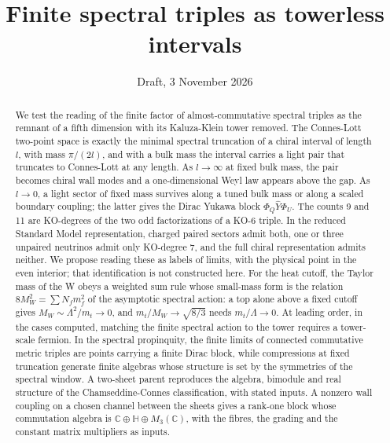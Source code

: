 \documentclass[aps,prd,reprint,onecolumn,nofootinbib,amsmath,amssymb,floatfix]{revtex4-2}
\theoremstyle{plain}
\newcommand{\C}{\mathbb C}
\renewcommand{\H}{\mathbb H}
\begin{document}
\title{Finite spectral triples as towerless intervals}
\date{Draft, 3 November 2026}

\begin{abstract}
We test the reading of the finite factor of almost-commutative spectral triples as the remnant of a fifth dimension with its Kaluza-Klein tower removed. The Connes-Lott two-point space is exactly the minimal spectral truncation of a chiral interval of length $l$, with mass $\pi/(2l)$, and with a bulk mass the interval carries a light pair that truncates to Connes-Lott at any length. As $l\to\infty$ at fixed bulk mass, the pair becomes chiral wall modes and a one-dimensional Weyl law appears above the gap. As $l\to0$, a light sector of fixed mass survives along a tuned bulk mass or along a scaled boundary coupling; the latter gives the Dirac Yukawa block $\Phi_Q\hat Y\Phi_U$. The counts 9 and 11 are KO-degrees of the two odd factorizations of a KO-6 triple. In the reduced Standard Model representation, charged paired sectors admit both, one or three unpaired neutrinos admit only KO-degree 7, and the full chiral representation admits neither. We propose reading these as labels of limits, with the physical point in the even interior; that identification is not constructed here. For the heat cutoff, the Taylor mass of the W obeys a weighted sum rule whose small-mass form is the relation $8M_W^2=\sum N_fm_f^2$ of the asymptotic spectral action: a top alone above a fixed cutoff gives $M_W\sim\Lambda^2/m_t\to0$, and $m_t/M_W\to\sqrt{8/3}$ needs $m_t/\Lambda\to0$. At leading order, in the cases computed, matching the finite spectral action to the tower requires a tower-scale fermion. In the spectral propinquity, the finite limits of connected commutative metric triples are points carrying a finite Dirac block, while compressions at fixed truncation generate finite algebras whose structure is set by the symmetries of the spectral window. A two-sheet parent reproduces the algebra, bimodule and real structure of the Chamseddine-Connes classification, with stated inputs. A nonzero wall coupling on a chosen channel between the sheets gives a rank-one block whose commutation algebra is $\C\oplus\H\oplus M_3(\C)$, with the fibres, the grading and the constant matrix multipliers as inputs.
\end{abstract}

\maketitle
\end{document}
